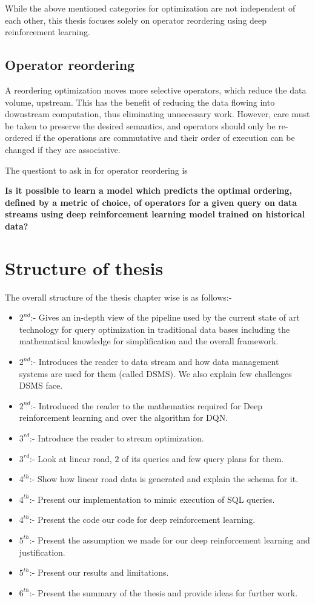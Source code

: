 While the above mentioned categories for optimization are not independent of each other, this thesis focuses solely on operator reordering using deep reinforcement learning.  

\subsection{Operator reordering}
A reordering optimization moves more selective operators, which reduce the data volume, upstream. This has the benefit of reducing the data flowing into downstream computation, thus eliminating unnecessary work. However, care must be taken to preserve the desired semantics, and operators should only be re-ordered if the operations are commutative and their order of execution can be changed if they are associative. \cite{stream_query_optimization}
\par The questiont to ask in for operator reordering is
\begin{center}
    \textbf{Is it possible to learn a model which predicts the optimal ordering, defined by a metric of choice, of operators for a given query on data streams using deep reinforcement learning model trained on historical data?}
\end{center}
\section{Structure of thesis}
\label{sec:Structure of thesis}
The overall structure of the thesis chapter wise is as follows:-
\begin{itemize}
    \item $2^{nd}$:- Gives an in-depth view of the pipeline used by the current state of art technology for query optimization in traditional data bases including the mathematical knowledge for simplification and the overall framework.
    \item $2^{nd}$:- Introduces the reader to data stream and how data management systems are used for them (called DSMS). We also explain few challenges DSMS face.
    \item $2^{nd}$:- Introduced the reader to the mathematics required for Deep reinforcement learning and over the algorithm for DQN.
    \item $3^{rd}$:- Introduce the reader to stream optimization.
    \item $3^{rd}$:- Look at linear road, $2$ of its queries and few query plans for them.
    \item $4^{th}$:- Show how linear road data is generated and explain the schema for it.
    \item $4^{th}$:- Present our implementation to mimic execution of SQL queries.
    \item $4^{th}$:- Present the code our code for deep reinforcement learning.
    \item $5^{th}$:- Present the assumption we made for our deep reinforcement learning and justification.
    \item $5^{th}$:- Present our results and limitations.
    \item $6^{th}$:- Present the summary of the thesis and provide ideas for further work.
\end{itemize}

